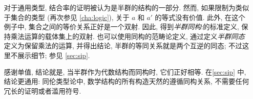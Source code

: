 对于通用类型, 结合率的证明被认为是半群的结构的一部分.
然而, 如果限制为类似于集合的类型 (再次参见 \cref{cha:logic}), 关于 $a$ 和 $a'$ 的等式没有价值.
此外, 在这个例子中, 集合之间的等价关系正好是一个双射.
因此, 得到\emph{半群同构}:的标准定义, 保持乘法运算的载体集上的双射.
也可以使用同构的范畴论定义, 通过定义\emph{半群同态}定义为保留乘法的运算, 并得出结论, 半群的等同关系就是两个互逆的同态;
不过这里不展示细节;
参见 \cref{sec:sip}.

感谢单值, 结论就是, 当半群作为代数结构而同构时, 它们正好相等.
在\cref{sec:sip} 中, 结论更通用: 同伦类型论中, 数学结构的所有构造天然的遵循同构关系, 不需要任何冗长的证明或者滥用符号.